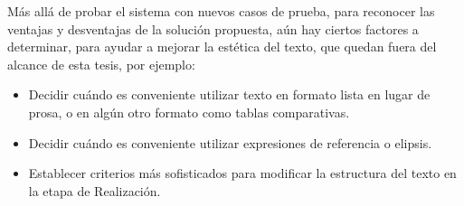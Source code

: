 Más allá de probar el sistema con nuevos casos de prueba, para reconocer las ventajas y desventajas de la solución propuesta, aún hay ciertos factores a determinar, para ayudar a mejorar la estética del texto, que quedan fuera del alcance de esta tesis, por ejemplo:
\begin{itemize}
    \item Decidir cuándo es conveniente utilizar texto en formato lista en lugar de prosa, o en algún otro formato como tablas comparativas.
    \item Decidir cuándo es conveniente utilizar expresiones de referencia o elipsis.
    \item Establecer criterios más sofisticados para modificar la estructura del texto en la etapa de Realización. 
\end{itemize}
